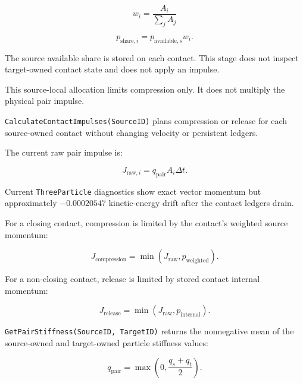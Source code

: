 \begin{equation}
w_i = \frac{A_i}{\sum_j A_j}
\end{equation}

\begin{equation}
p_{\mathrm{share},i} = p_{\mathrm{available},s} w_i.
\end{equation}

The source available share is stored on each contact.  This stage does not
inspect target-owned contact state and does not apply an impulse.

This source-local allocation limits compression only.  It does not multiply
the physical pair impulse.


\texttt{CalculateContactImpulses(SourceID)} plans compression or release for
each source-owned contact without changing velocity or persistent ledgers.

The current raw pair impulse is:

\begin{equation}
J_{\mathrm{raw},i}
=
q_{\mathrm{pair}} A_i
\Delta t.
\end{equation}

Current \texttt{ThreeParticle} diagnostics show exact vector momentum but
approximately \(-0.00020547\) kinetic-energy drift after the contact ledgers
drain.

For a closing contact, compression is limited by the contact's weighted source
momentum:

\begin{equation}
J_{\mathrm{compression}}
=
\min(J_{\mathrm{raw}},p_{\mathrm{weighted}}).
\end{equation}

For a non-closing contact, release is limited by stored contact internal
momentum:

\begin{equation}
J_{\mathrm{release}}
=
\min(J_{\mathrm{raw}},p_{\mathrm{internal}}).
\end{equation}


\texttt{GetPairStiffness(SourceID, TargetID)} returns the nonnegative mean of
the source-owned and target-owned particle stiffness values:

\begin{equation}
q_{\mathrm{pair}} = \max\left(0,\frac{q_s+q_t}{2}\right).
\end{equation}


